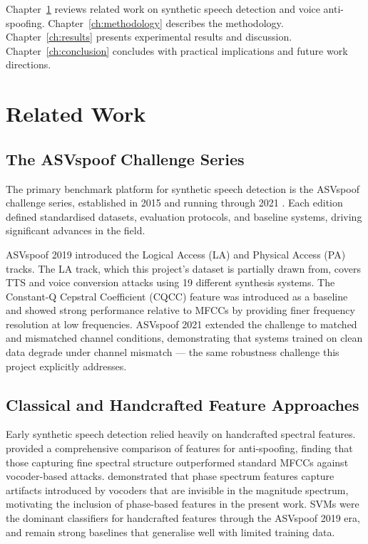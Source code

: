 \documentclass[12pt, a4paper, oneside]{report}
\begin{document}
Chapter~\ref{ch:litreview} reviews related work on synthetic speech detection and voice anti-spoofing. Chapter~\ref{ch:methodology} describes the methodology. Chapter~\ref{ch:results} presents experimental results and discussion. Chapter~\ref{ch:conclusion} concludes with practical implications and future work directions.

\chapter{Related Work}
\label{ch:litreview}

\section{The ASVspoof Challenge Series}

The primary benchmark platform for synthetic speech detection is the ASVspoof challenge series, established in 2015 and running through 2021 \citep{nautsch2021}. Each edition defined standardised datasets, evaluation protocols, and baseline systems, driving significant advances in the field.

ASVspoof 2019 introduced the Logical Access (LA) and Physical Access (PA) tracks. The LA track, which this project's dataset is partially drawn from, covers TTS and voice conversion attacks using 19 different synthesis systems. The Constant-Q Cepstral Coefficient (CQCC) feature was introduced as a baseline and showed strong performance relative to MFCCs by providing finer frequency resolution at low frequencies. ASVspoof 2021 extended the challenge to matched and mismatched channel conditions, demonstrating that systems trained on clean data degrade under channel mismatch --- the same robustness challenge this project explicitly addresses.

\section{Classical and Handcrafted Feature Approaches}

Early synthetic speech detection relied heavily on handcrafted spectral features. \citet{sahidullah2015} provided a comprehensive comparison of features for anti-spoofing, finding that those capturing fine spectral structure outperformed standard MFCCs against vocoder-based attacks. \citet{patel2015} demonstrated that phase spectrum features capture artifacts introduced by vocoders that are invisible in the magnitude spectrum, motivating the inclusion of phase-based features in the present work. SVMs were the dominant classifiers for handcrafted features through the ASVspoof 2019 era, and remain strong baselines that generalise well with limited training data.
\end{document}

